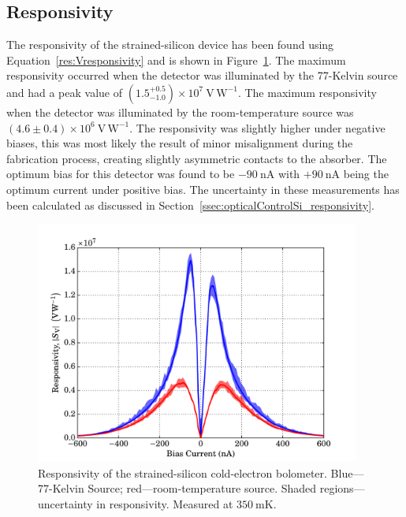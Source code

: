 \subsection{Responsivity}\label{ssec:opticalStrainedSi_responsivity}
The responsivity of the strained-silicon device has been found using Equation~\ref{res:Vresponsivity} and is shown in Figure~\ref{fig:strainedResponsivity}. The maximum responsivity occurred when the detector was illuminated by the 77-Kelvin source and had a peak value of $\left(1.5^{+0.5}_{-1.0}\right) \times 10^{7}~\mathrm{V\,W^{-1}}$. The maximum responsivity when the detector was illuminated by the room-temperature source was $\left(4.6 \pm 0.4\right) \times 10^{6}~\mathrm{V\,W^{-1}}$. The responsivity was slightly higher under negative biases, this was most likely the result of minor misalignment during the fabrication process, creating slightly asymmetric contacts to the absorber. The optimum bias for this detector was found to be $-90~\mathrm{nA}$ with $+90~\mathrm{nA}$ being the optimum current under positive bias. The uncertainty in these measurements has been calculated as discussed in Section~\ref{ssec:opticalControlSi_responsivity}.
\begin{figure}[tb]
\begin{center}
\includegraphics[width = 0.95\textwidth]{figures/strained_responsivity}
\caption[Responsivity of the strained-\gls{acr:SiCEB} device]{Responsivity of the strained-silicon cold-electron bolometer. Blue---77-Kelvin Source; red---room-temperature source. Shaded regions---uncertainty in responsivity. Measured at $350~\mathrm{mK}$.}
\label{fig:strainedResponsivity}
\end{center}
\end{figure}

